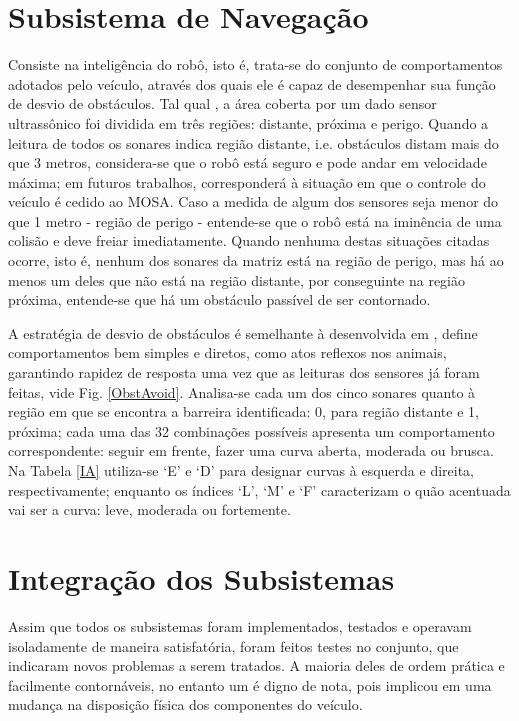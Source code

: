 \section{Subsistema de Navegação} %
Consiste na inteligência  do robô, isto é, trata-se do conjunto de comportamentos adotados pelo veículo, através dos quais ele é capaz de 
desempenhar sua função de desvio de obstáculos. %
Tal qual \cite{Artigo_3}, a área coberta por um dado sensor ultrassônico foi dividida em três regiões: distante, próxima e perigo.
Quando a leitura de todos os sonares indica região distante, i.e. obstáculos distam mais do que 3 metros, considera-se que o robô 
está seguro e pode andar em velocidade máxima; em futuros trabalhos, corresponderá à situação em que o controle do veículo é cedido ao MOSA.
Caso a medida de algum dos sensores seja menor do que 1 metro - região de perigo - entende-se que o robô está na iminência de uma colisão e deve 
freiar imediatamente.
Quando nenhuma destas situações citadas ocorre, isto é, nenhum dos sonares da matriz está na região de perigo, mas há ao menos um deles que não está 
na região distante, por conseguinte na região próxima, entende-se que há um obstáculo passível de ser contornado.

A estratégia de desvio de obstáculos é semelhante à desenvolvida em \cite{Artigo_1}, define comportamentos bem simples e diretos, como atos reflexos 
nos animais, garantindo rapidez de resposta uma vez que as leituras dos sensores já foram feitas, vide Fig. \ref{ObstAvoid}.
Analisa-se cada um dos cinco sonares quanto à região em que se encontra a barreira identificada: 0, para região distante e 1, próxima;
cada uma das 32 combinações possíveis apresenta um comportamento correspondente: seguir em frente, fazer uma curva aberta, moderada ou brusca.
Na Tabela \ref{IA} utiliza-se \textquoteleft E\textquoteright{} e  \textquoteleft D\textquoteright{} para designar curvas à esquerda e direita, 
respectivamente; enquanto os índices \textquoteleft L\textquoteright{},  \textquoteleft M\textquoteright{} e \textquoteleft F\textquoteright{} 
caracterizam o quão acentuada vai ser a curva: leve, moderada ou fortemente. %

\section{Integração dos Subsistemas}
Assim que todos os subsistemas foram implementados, testados e operavam isoladamente de maneira satisfatória, foram feitos testes no conjunto, que 
indicaram novos problemas a serem tratados. 
A maioria deles de ordem prática e facilmente contornáveis, no entanto um é digno de nota, pois implicou em uma mudança na disposição física dos 
componentes do veículo.

